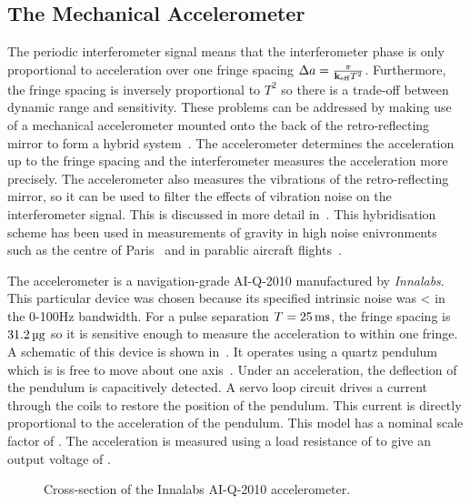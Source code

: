 \subsection{The Mechanical Accelerometer}\label{subsec:raman_mems}
The periodic interferometer signal means that the interferometer phase is only
proportional to acceleration over one fringe spacing \(\Delta a =
\frac{\pi}{{\textbf k_\textnormal{eff}} T^2}\). Furthermore, the fringe spacing is inversely
proportional to \(T^2\) so there is a trade-off between dynamic range and
sensitivity. These problems can be addressed by making use of a mechanical
accelerometer mounted onto the back of the retro-reflecting mirror to form a
hybrid system~\cite{Lautier2014}. The accelerometer determines the acceleration
up to the fringe spacing  and the interferometer measures the acceleration more
precisely. The accelerometer also measures the vibrations of the
retro-reflecting mirror, so it can be used to filter the effects of vibration
noise on the interferometer signal. This is discussed in more detail
in~. This hybridisation scheme has been
used in measurements of gravity in high noise enivronments such as the centre of
Paris~\cite{Merlet2009} and in parablic aircraft
flights~\cite{Geiger2011a,Barrett2016a}. \par\noindent The accelerometer is a
navigation-grade AI-Q-2010 manufactured by \textit{Innalabs}. This particular
device was chosen because its specified intrinsic noise was
< in the 0-100\ac{Hz} bandwidth. For a pulse separation \(T
= \sivalue{25}{\milli\second}\), the fringe spacing is
\(\sivalue{31.2}{\micro\g}\) so it is sensitive enough to measure the
acceleration to within one fringe. A schematic of this device is shown
in~. It operates using a quartz pendulum which is is
free to move about one axis~\cite{Foote1992}. Under an acceleration, the
deflection of the pendulum is capacitively detected. A servo loop circuit drives
a current through the coils to restore the position of the pendulum. This
current is directly proportional to the acceleration of the pendulum. This model
has a nominal scale factor of . The
acceleration is measured using a load resistance of  to
give an output voltage of .
\begin{figure}[!htbp] \centering
	\resizebox{0.5\textwidth}{!}{}
	\caption[Innalabs accelerometer cross-section]{Cross-section of the Innalabs
		AI-Q-2010 accelerometer.} \label{fig:innalabs}
\end{figure}
